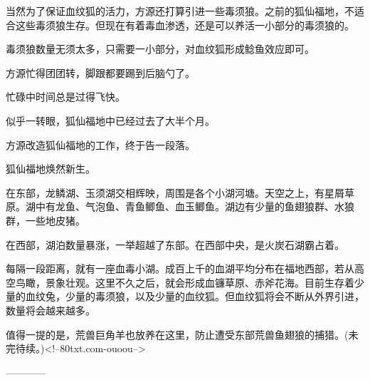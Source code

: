 \begin{this_body}
当然为了保证血纹狐的活力，方源还打算引进一些毒须狼。之前的狐仙福地，不适合这些毒须狼生存。但现在有着毒血渗透，还是可以养活一小部分的毒须狼的。

毒须狼数量无须太多，只需要一小部分，对血纹狐形成鲶鱼效应即可。

方源忙得团团转，脚跟都要踢到后脑勺了。

忙碌中时间总是过得飞快。

似乎一转眼，狐仙福地中已经过去了大半个月。

方源改造狐仙福地的工作，终于告一段落。

狐仙福地焕然新生。

在东部，龙鳞湖、玉须湖交相辉映，周围是各个小湖河塘。天空之上，有星屑草原。湖中有龙鱼、气泡鱼、青鱼鲫鱼、血玉鲫鱼。湖边有少量的鱼翅狼群、水狼群，一些地皮猪。

在西部，湖泊数量暴涨，一举超越了东部。在西部中央，是火炭石湖霸占着。

每隔一段距离，就有一座血毒小湖。成百上千的血湖平均分布在福地西部，若从高空鸟瞰，景象壮观。这里不久之后，就会形成血镰草原、赤斧花海。目前生存着少量的血纹兔，少量的毒须狼，以及少量的血纹狐。但血纹狐将会不断从外界引进，数量将会越来越多。

值得一提的是，荒兽巨角羊也放养在这里，防止遭受东部荒兽鱼翅狼的捕猎。(未完待续。)<!--80txt.com-ouoou-->

------------

\end{this_body}

